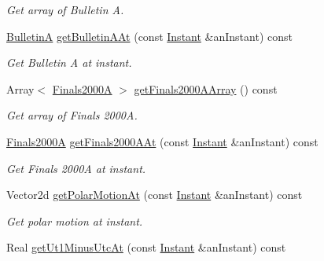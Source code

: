 \begin{DoxyCompactItemize}
\begin{DoxyCompactList}\small\item\em Get array of Bulletin A. \end{DoxyCompactList}\item 
\hyperlink{classostk_1_1physics_1_1coord_1_1frame_1_1provider_1_1iers_1_1_bulletin_a}{BulletinA} \hyperlink{classostk_1_1physics_1_1coord_1_1frame_1_1provider_1_1iers_1_1_manager_a50eef4d573db5ad33f6ce7ee13749ad9}{get\+Bulletin\+A\+At} (const \hyperlink{classostk_1_1physics_1_1time_1_1_instant}{Instant} \&an\+Instant) const
\begin{DoxyCompactList}\small\item\em Get Bulletin A at instant. \end{DoxyCompactList}\item 
Array$<$ \hyperlink{classostk_1_1physics_1_1coord_1_1frame_1_1provider_1_1iers_1_1_finals2000_a}{Finals2000A} $>$ \hyperlink{classostk_1_1physics_1_1coord_1_1frame_1_1provider_1_1iers_1_1_manager_acb2063043a35249010b4881b22cc5391}{get\+Finals2000\+A\+Array} () const
\begin{DoxyCompactList}\small\item\em Get array of Finals 2000A. \end{DoxyCompactList}\item 
\hyperlink{classostk_1_1physics_1_1coord_1_1frame_1_1provider_1_1iers_1_1_finals2000_a}{Finals2000A} \hyperlink{classostk_1_1physics_1_1coord_1_1frame_1_1provider_1_1iers_1_1_manager_a57081be2537ed82f94729c5954d2c28d}{get\+Finals2000\+A\+At} (const \hyperlink{classostk_1_1physics_1_1time_1_1_instant}{Instant} \&an\+Instant) const
\begin{DoxyCompactList}\small\item\em Get Finals 2000A at instant. \end{DoxyCompactList}\item 
Vector2d \hyperlink{classostk_1_1physics_1_1coord_1_1frame_1_1provider_1_1iers_1_1_manager_a2e2fb0b741c41e8936f1ed20d7b2b873}{get\+Polar\+Motion\+At} (const \hyperlink{classostk_1_1physics_1_1time_1_1_instant}{Instant} \&an\+Instant) const
\begin{DoxyCompactList}\small\item\em Get polar motion at instant. \end{DoxyCompactList}\item 
Real \hyperlink{classostk_1_1physics_1_1coord_1_1frame_1_1provider_1_1iers_1_1_manager_ac0670e062b624d5b1881a820275bb906}{get\+Ut1\+Minus\+Utc\+At} (const \hyperlink{classostk_1_1physics_1_1time_1_1_instant}{Instant} \&an\+Instant) const

\end{DoxyCompactItemize}

